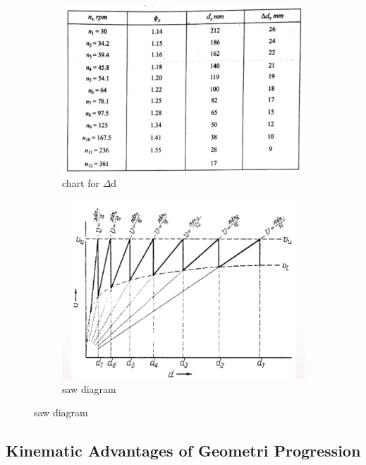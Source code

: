 \documentclass{article}
\begin{document}
\begin{figure}[h]
  \centering

  \begin{subfigure}{0.48\textwidth}
    \centering
    \includegraphics[width=\linewidth]{img/lp_table.jpeg}
    \caption{chart for $\Delta$d}
  \end{subfigure}
  \hfill
  \begin{subfigure}{0.48\textwidth}
    \centering
    \includegraphics[width=\linewidth]{img/saw_dia_lp.jpeg}
    \caption{saw diagram}
    \label{fig:saw diagram of LP}
  \end{subfigure}
\end{figure}

\subsection*{Kinematic Advantages of Geometri Progression}
\end{document}
